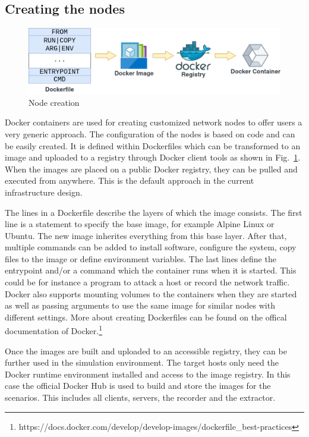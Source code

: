 \documentclass[conference]{IEEEtran}
\begin{document}
\newpage 

\subsection{Creating the nodes}

\begin{figure}[htbp]
\centerline{\includegraphics[scale=0.24]{docker.png}}
\caption{Node creation}
\label{node_creation}
\end{figure}

Docker containers are used for creating customized network nodes to offer users a very generic approach. The configuration of the nodes is based on code and can be easily created. It is defined within Dockerfiles which can be transformed to an image and uploaded to a registry through Docker client tools as shown in Fig.~\ref{node_creation}. When the images are placed on a public Docker registry, they can be pulled and executed from anywhere. This is the default approach in the current infrastructure design. 

The lines in a Dockerfile describe the layers of which the image consists. The first line is a statement to specify the base image, for example Alpine Linux or Ubuntu. The new image inherites everything from this base layer. After that, multiple commands can be added to install software, configure the system, copy files to the image or define environment variables. The last lines define the entrypoint and/or a command which the container runs when it is started. This could be for instance a program to attack a host or record the network traffic. Docker also supports mounting volumes to the containers when they are started as well as passing arguments to use the same image for similar nodes with different settings. More about creating Dockerfiles can be found on the offical documentation of Docker.\footnote{https://docs.docker.com/develop/develop-images/dockerfile\_best-practices} 

Once the images are built and uploaded to an accessible registry, they can be further used in the simulation environment. The target hosts only need the Docker runtime environment installed and access to the image registry. In this case the official Docker Hub is used to build and store the images for the scenarios. This includes all clients, servers, the recorder and the extractor.
\end{document}
